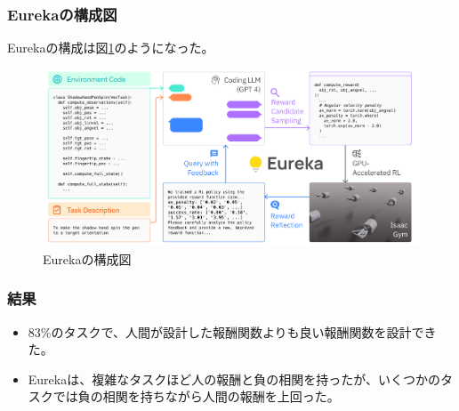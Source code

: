 \documentclass[dvipdfmx,12pt]{beamer}%
\begin{document}
\begin{frame}
\frametitle{Eurekaの構成図}
Eurekaの構成は図\ref{fig:eureka}のようになった。

\begin{figure}[t]
\centering
\includegraphics[width=0.8\linewidth]{eureka.png}
\caption{Eurekaの構成図}
\label{fig:eureka}
\end{figure}
\end{frame}

\begin{frame}
\frametitle{結果}
\begin{itemize}
\item 83\%のタスクで、人間が設計した報酬関数よりも良い報酬関数を設計できた。
\item Eurekaは、複雑なタスクほど人の報酬と負の相関を持ったが、いくつかのタスクでは負の相関を持ちながら人間の報酬を上回った。
\end{itemize}
\end{frame}

\end{document}
